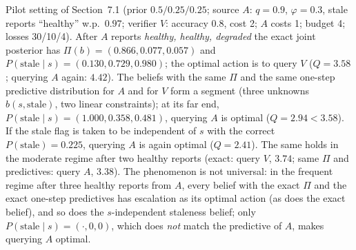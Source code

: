 \begin{example}\label{ex:suff}
Pilot setting of Section~7.1 (prior $0.5/0.25/0.25$; source $A$: $q=0.9$, $\varphi=0.3$, stale reports ``healthy''
w.p.\ $0.97$; verifier $V$: accuracy $0.8$, cost 2; $A$ costs 1; budget 4; losses 30/10/4). After $A$ reports
\emph{healthy, healthy, degraded} the exact joint posterior has $\Pi(b)=(0.866,0.077,0.057)$ and
$P(\text{stale}\mid s)=(0.130,0.729,0.980)$; the optimal action is to query $V$ ($Q=3.58$; querying $A$ again: $4.42$).
The beliefs with the same $\Pi$ and the same one-step predictive distribution for $A$ and for $V$ form a segment
(three unknowns $b(s,\text{stale})$, two linear constraints); at its far end,
$P(\text{stale}\mid s)=(1.000,0.358,0.481)$, querying $A$ is optimal ($Q=2.94<3.58$). If the stale flag is taken to be
independent of $s$ with the correct $P(\text{stale})=0.225$, querying $A$ is again optimal ($Q=2.41$). The same holds in
the moderate regime after two healthy reports (exact: query $V$, $3.74$; same $\Pi$ and predictives: query $A$, $3.38$).
The phenomenon is not universal: in the frequent regime after three healthy reports from $A$, every belief with the
exact $\Pi$ and the exact one-step predictives has escalation as its optimal action (as does the exact belief), and
so does the $s$-independent staleness belief; only $P(\text{stale}\mid s)=(\cdot,0,0)$, which does \emph{not} match the
predictive of $A$, makes querying $A$ optimal.
\end{example}

